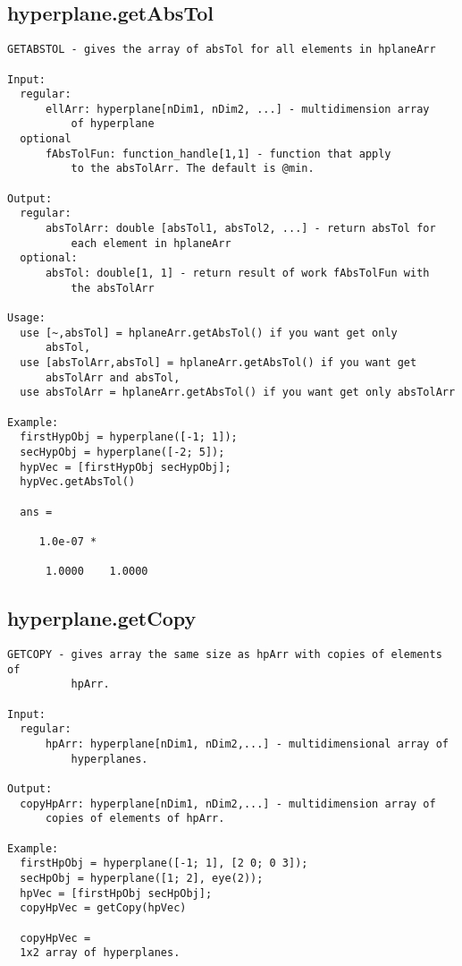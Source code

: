 \subsection{\texorpdfstring{hyperplane.getAbsTol}{getAbsTol}}\label{method:hyperplane.getAbsTol}
\begin{verbatim}
GETABSTOL - gives the array of absTol for all elements in hplaneArr

Input:
  regular:
      ellArr: hyperplane[nDim1, nDim2, ...] - multidimension array
          of hyperplane
  optional
      fAbsTolFun: function_handle[1,1] - function that apply
          to the absTolArr. The default is @min.

Output:
  regular:
      absTolArr: double [absTol1, absTol2, ...] - return absTol for
          each element in hplaneArr
  optional:
      absTol: double[1, 1] - return result of work fAbsTolFun with
          the absTolArr

Usage:
  use [~,absTol] = hplaneArr.getAbsTol() if you want get only
      absTol,
  use [absTolArr,absTol] = hplaneArr.getAbsTol() if you want get
      absTolArr and absTol,
  use absTolArr = hplaneArr.getAbsTol() if you want get only absTolArr

Example:
  firstHypObj = hyperplane([-1; 1]);
  secHypObj = hyperplane([-2; 5]);
  hypVec = [firstHypObj secHypObj];
  hypVec.getAbsTol()

  ans =

     1.0e-07 *

      1.0000    1.0000
\end{verbatim}
\subsection{\texorpdfstring{hyperplane.getCopy}{getCopy}}\label{method:hyperplane.getCopy}
\begin{verbatim}
GETCOPY - gives array the same size as hpArr with copies of elements of
          hpArr.

Input:
  regular:
      hpArr: hyperplane[nDim1, nDim2,...] - multidimensional array of
          hyperplanes.

Output:
  copyHpArr: hyperplane[nDim1, nDim2,...] - multidimension array of
      copies of elements of hpArr.

Example:
  firstHpObj = hyperplane([-1; 1], [2 0; 0 3]);
  secHpObj = hyperplane([1; 2], eye(2));
  hpVec = [firstHpObj secHpObj];
  copyHpVec = getCopy(hpVec)

  copyHpVec =
  1x2 array of hyperplanes.
\end{verbatim}

